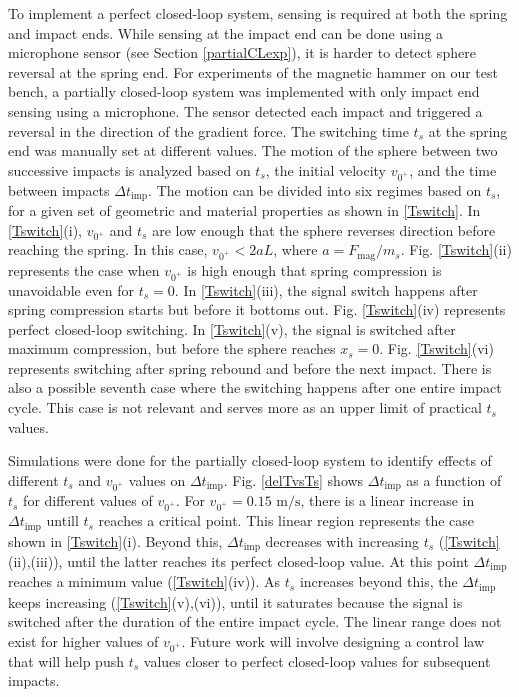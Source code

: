 \documentclass[letterpaper, 10 pt, journal, twoside]{ieeetran}
\begin{document}
To implement a perfect closed-loop system, sensing is required at both the spring and impact ends. While sensing at the impact end can be done using a microphone sensor (see Section \ref{partialCLexp}), it is harder to detect sphere reversal at the spring end. For experiments of the magnetic hammer on our test bench, a partially closed-loop system was implemented with only impact end sensing using a microphone. The sensor detected each impact and triggered a reversal in the direction of the gradient force. The switching time $t_s$ at the spring end was manually set at different values. The motion of the sphere between two successive impacts is analyzed based on $t_s$, the initial velocity $v_{0^+}$, and the time between impacts $\Delta t_{\textrm{imp}}$. The motion can be divided into six regimes based on $t_s$, for a given set of geometric and material properties as shown in \cref{Tswitch}. In \cref{Tswitch}(i), $v_{0^+}$ and $t_s$ are low enough that the sphere reverses direction before reaching the spring. In this case, $v_{0^+} < 2aL$, where $a=F_{\textrm{mag}}/m_s$. Fig. \ref{Tswitch}(ii) represents the case when $v_{0^+}$ is high enough that spring compression is unavoidable even for $t_s = 0$. In \cref{Tswitch}(iii), the signal switch happens after spring compression starts but before it bottoms out. Fig. \ref{Tswitch}(iv) represents perfect closed-loop switching. In \cref{Tswitch}(v), the signal is switched after maximum compression, but before the sphere reaches $x_s=0$. Fig. \ref{Tswitch}(vi) represents switching after spring rebound and before the next impact. There is also a possible seventh case where the switching happens after one entire impact cycle. This case is not relevant and serves more as an upper limit of practical $t_s$ values. 

Simulations were done for the partially closed-loop system to identify effects of different $t_s$ and $v_{0^+}$ values on $\Delta t_{\textrm{imp}}$. Fig. \ref{delTvsTs} shows $\Delta t_{\textrm{imp}}$ as a function of $t_s$ for different values of $v_{0^+}$. For $v_{0^+}=0.15\text{ m/s}$, there is a linear increase in $\Delta t_{\textrm{imp}}$ untill $t_s$ reaches a critical point. This linear region represents the case shown in \cref{Tswitch}(i). Beyond this, $\Delta t_{\textrm{imp}}$ decreases with increasing $t_s$ (\cref{Tswitch}(ii),(iii)), until the latter reaches its perfect closed-loop value. At this point $\Delta t_{\textrm{imp}}$ reaches a minimum value (\cref{Tswitch}(iv)). As $t_s$ increases beyond this, the $\Delta t_{\textrm{imp}}$ keeps increasing (\cref{Tswitch}(v),(vi)), until it saturates because the signal is switched after the duration of the entire impact cycle. The linear range does not exist for higher values of $v_{0^+}$. Future work will involve designing a control law that will help push $t_s$ values closer to perfect closed-loop values for subsequent impacts.
\end{document}
